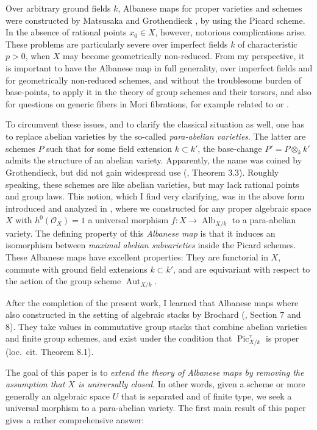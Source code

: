 \documentclass[oneside, 12pt]{amsart}
\theoremstyle{definition}
\theoremstyle{remark}
\newcommand{\Alb}{\operatorname{Alb}}
\newcommand{\Aut}{\operatorname{Aut}}
\renewcommand{\O}{\mathscr{O}}
\newcommand{\Pic}{\operatorname{Pic}}
\newcommand{\ra}{\rightarrow}
\begin{document}
Over   arbitrary ground fields $k$, Albanese maps for proper varieties and schemes were constructed 
by Matsusaka \cite{Matsusaka 1953} and Grothendieck \cite{FGA VI},
by using the Picard scheme. 
In the absence of rational points $x_0\in X$, however,   notorious complications arise.
These problems are particularly severe over imperfect fields $k$ of characteristic $p>0$, when $X$ may become geometrically non-reduced.
From my perspective, it is important to have the Albanese map in  full generality,   over imperfect fields and for
geometrically non-reduced schemes, and without the 
troublesome burden of base-points,
to apply it  in the  theory of group schemes and their torsors, and also for questions on generic fibers in Mori fibrations,
for example related to \cite{Brion; Schroeer 2023} or \cite{Fanelli; Schroeer 2020a}.

To circumvent these issues, and to clarify the classical situation as well, one has to replace   abelian varieties by the so-called \emph{para-abelian varieties}.
The latter are schemes $P$ such that for 
some field extension $k\subset k'$, the base-change $P'=P\otimes_kk'$ admits the structure of an abelian variety.
Apparently, the name was coined by Grothendieck, but did not gain widespread use (\cite{FGA VI}, Theorem 3.3).  
Roughly speaking, these schemes are like abelian varieties, but may lack rational points and group laws.
This notion, which I find very clarifying,  was  in the above form introduced and  analyzed in \cite{Laurent; Schroeer 2021}, where 
we  constructed for any proper algebraic space $X$ with $h^0(\O_X)=1$ a universal morphism $f:X\ra\Alb_{X/k}$
to a para-abelian variety. The defining property of this \emph{Albanese map}  is that
it induces an isomorphism between \emph{maximal abelian subvarieties} inside the Picard schemes.  
These Albanese maps have excellent properties: They are    functorial in $X$, commute  with ground field extensions $k\subset k'$, and 
are equivariant with respect to the action of the group scheme $\Aut_{X/k}$.

After the completion of the present work, I learned that Albanese maps where also constructed  in the setting of 
algebraic stacks by Brochard (\cite{Brochard 2021}, Section 7 and 8). They take values in commutative group stacks
that combine abelian varieties and finite group schemes, and exist under the condition that  $\Pic^\tau_{X/k}$ is proper
(loc.\ cit. Theorem 8.1).  

The goal of this paper is to \emph{extend the theory of Albanese maps by removing the assumption that $X$ is universally closed}.
In other words, given a scheme or more generally an  algebraic space $U$ that is separated and of finite type, we seek a universal morphism to a para-abelian variety.
The first main result of this paper gives a rather comprehensive answer:
\end{document}
